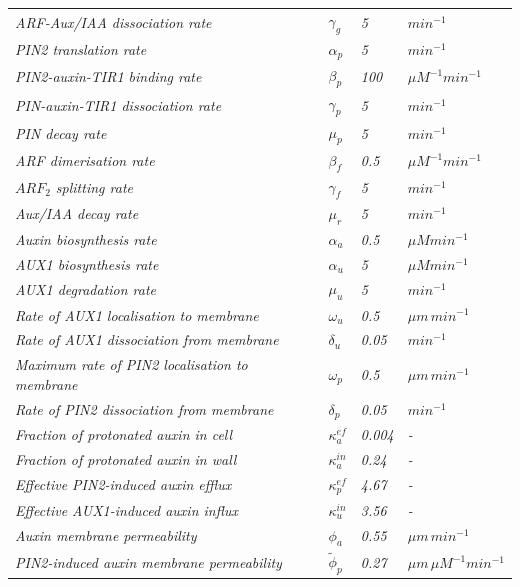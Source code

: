 \documentclass[11pt]{article}
\begin{document}
\begin{table}[htbp]
{\begin{tabular}{@{}>{\raggedright\arraybackslash\itshape}p{4.2cm}>{\raggedright\arraybackslash\itshape}p{0.6cm}>{\raggedright\arraybackslash\itshape}p{0.5cm}>{\raggedright\arraybackslash\itshape}p{2.1cm}@{}}
ARF-Aux/IAA dissociation rate     & \(\gamma_g\)  & 5  & \(min^{-1}\)  \\
PIN2 translation rate     &   \(\alpha_p\)    & 5     &  \(min^{-1}\) \\
PIN2-auxin-TIR1 binding rate      & \(\beta_p\)  & 100      &  \(\mu M^{-1} min^{-1}\)     \\
PIN-auxin-TIR1 dissociation rate    & \(\gamma_p\)  & 5       &  \(min^{-1}\)     \\
PIN decay rate        &    \(\mu_p\)          & 5     &   \(min^{-1}\)     \\
ARF dimerisation rate     &  \(\beta_f\)  & 0.5     &  \(\mu M^{-1} min^{-1}\)     \\
\(ARF_2\) splitting rate      & \(\gamma_f\)   & 5       &  \(min^{-1}\)     \\
Aux/IAA decay rate       &   \(\mu_r\)          & 5     &  \(min^{-1}\)       \\
Auxin biosynthesis rate    &  \(\alpha_a\)   & 0.5      &  \(\mu M min^{-1}\)     \\
AUX1 biosynthesis rate    & \(\alpha_u\)    & 5     &  \(\mu M min^{-1}\)     \\
AUX1 degradation rate        &   \(\mu_u\)          & 5      &   \(min^{-1}\)     \\
Rate of AUX1 localisation to membrane     &   \(\omega_u\)         & 0.5     &   \(\mu m \, min^{-1}\)     \\
Rate of AUX1 dissociation from membrane   & \(\delta_u\)    & 0.05        &  \(min^{-1}\)     \\
Maximum rate of PIN2 localisation to membrane    &   \(\omega_p\)      & 0.5     &  \(\mu m \, min^{-1}\) \\
Rate of PIN2 dissociation from membrane     & \(\delta_p\)   & 0.05        & \(min^{-1}\)  \\
Fraction of protonated auxin in cell   &  \(\kappa_a^{ef}\)     & 0.004      &  - \\
Fraction of protonated auxin in wall  &  \(\kappa_a^{in}\)     & 0.24       &  - \\
Effective PIN2-induced auxin efflux  &  \(\kappa_p^{ef}\)     & 4.67        &  - \\
Effective AUX1-induced auxin influx   &   \(\kappa_u^{in}\)   & 3.56        &  - \\
Auxin membrane permeability         &  \(\phi_a\)    & 0.55      &   \(\mu m \, min^{-1}\) \\
PIN2-induced auxin membrane permeability  &   \(\tilde{\phi}_p\)   & 0.27  & \(\mu m \, \mu M^{-1} min^{-1}\)  \\

\end{tabular}}
\end{table}
\end{document}
